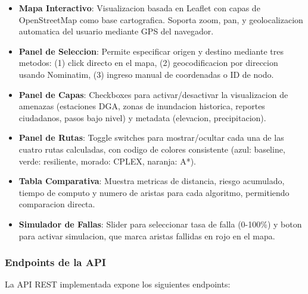 \documentclass[conference]{IEEEtran}
\begin{document}
\begin{itemize}
    \item \textbf{Mapa Interactivo}: Visualizacion basada en Leaflet con capas de OpenStreetMap como base cartografica. Soporta zoom, pan, y geolocalizacion automatica del usuario mediante GPS del navegador.

    \item \textbf{Panel de Seleccion}: Permite especificar origen y destino mediante tres metodos: (1) click directo en el mapa, (2) geocodificacion por direccion usando Nominatim, (3) ingreso manual de coordenadas o ID de nodo.

    \item \textbf{Panel de Capas}: Checkboxes para activar/desactivar la visualizacion de amenazas (estaciones DGA, zonas de inundacion historica, reportes ciudadanos, pasos bajo nivel) y metadata (elevacion, precipitacion).

    \item \textbf{Panel de Rutas}: Toggle switches para mostrar/ocultar cada una de las cuatro rutas calculadas, con codigo de colores consistente (azul: baseline, verde: resiliente, morado: CPLEX, naranja: A*).

    \item \textbf{Tabla Comparativa}: Muestra metricas de distancia, riesgo acumulado, tiempo de computo y numero de aristas para cada algoritmo, permitiendo comparacion directa.

    \item \textbf{Simulador de Fallas}: Slider para seleccionar tasa de falla (0-100\%) y boton para activar simulacion, que marca aristas fallidas en rojo en el mapa.
\end{itemize}

\subsubsection{Endpoints de la API}

La API REST implementada expone los siguientes endpoints:
\end{document}
